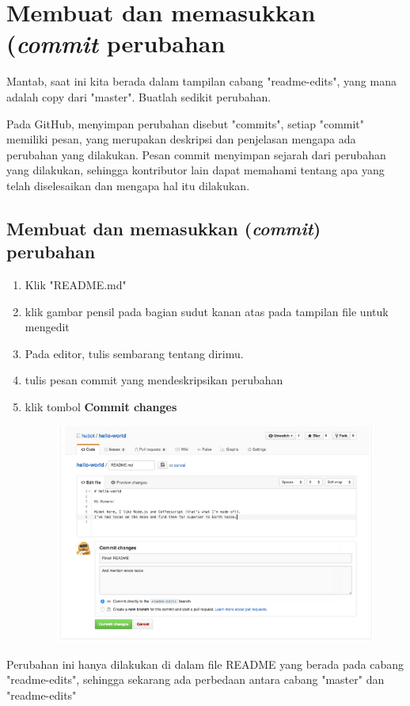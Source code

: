 \documentclass[12pt,a4paper]{article}
\begin{document}
\section{Membuat dan memasukkan (\textit{commit} perubahan}
Mantab, saat ini kita berada dalam tampilan cabang "readme-edits", yang mana adalah copy dari "master". Buatlah sedikit perubahan.

Pada GitHub, menyimpan perubahan disebut "commits", setiap "commit" memiliki pesan, yang merupakan deskripsi dan penjelasan mengapa ada perubahan yang dilakukan. Pesan commit menyimpan sejarah dari perubahan yang dilakukan, sehingga kontributor lain dapat memahami tentang apa yang telah diselesaikan dan mengapa hal itu dilakukan.

\subsection*{Membuat dan memasukkan (\textit{commit}) perubahan}

\begin{enumerate}
\item Klik "README.md"
\item klik gambar pensil pada bagian sudut kanan atas pada tampilan file untuk mengedit
\item Pada editor, tulis sembarang tentang dirimu.
\item tulis pesan commit yang mendeskripsikan perubahan
\item klik tombol \textbf{Commit changes}
\begin{figure}[h!]
\includegraphics[scale=0.5]{image/commit.png} 
\end{figure}
\end{enumerate}
Perubahan ini hanya dilakukan di dalam file README yang berada pada cabang "readme-edits", sehingga sekarang ada perbedaan antara cabang "master" dan "readme-edits"
\end{document}
